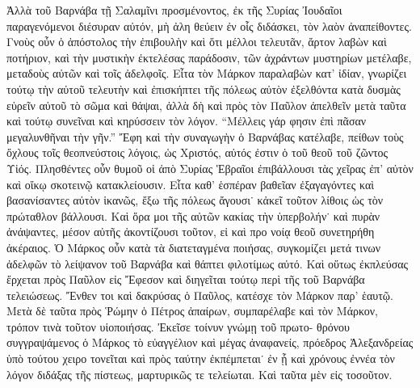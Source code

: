 Ἀλλὰ τοῦ Βαρνάβα τῇ Σαλαμῖνι προσμένοντος, ἐκ τῆς
Συρίας Ἰουδαῖοι παραγενόμενοι διέσυραν αὐτόν, μὴ ἀλη%
θεύειν ἐν οἷς διδάσκει, τὸν λαὸν ἀναπείθοντες. Γνοὺς
οὖν ὁ ἀπόστολος τὴν ἐπιβουλὴν καὶ ὅτι μέλλοι τελευτᾶν,
ἄρτον λαβὼν καὶ ποτήριον, καὶ τὴν μυστικὴν ἐκτελέσας
παράδοσιν, τῶν ἀχράντων μυστηρίων μετέλαβε, μεταδοὺς
αὐτῶν καὶ τοῖς ἀδελφοῖς. Εἶτα τὸν Μάρκον παραλαβὼν
κατ’ ἰδίαν, γνωρίζει τούτῳ τὴν αὐτοῦ τελευτὴν καὶ
ἐπισκήπτει τῆς πόλεως αὐτὸν ἐξελθόντα κατὰ δυσμὰς
εὑρεῖν αὐτοῦ τὸ σῶμα καὶ θάψαι, ἀλλὰ δὴ καὶ πρὸς
τὸν Παῦλον ἀπελθεῖν μετὰ ταῦτα καὶ τούτῳ συνεῖναι
καὶ κηρύσσειν τὸν λόγον. \enquote{Μέλλεις γάρ φησιν ἐπὶ πᾶσαν
μεγαλυνθῆναι τὴν γῆν.} Ἔφη καὶ τὴν συναγωγὴν ὁ
Βαρνάβας κατέλαβε, πείθων τοὺς ὄχλους τοῖς θεοπνεύστοις
λόγοις, ὡς Χριστός, αὐτός ἐστιν ὁ τοῦ θεοῦ τοῦ ζῶντος
Υἱός. Πλησθέντες οὖν θυμοῦ οἱ ἀπὸ Συρίας Ἑβραῖοι
ἐπιβάλλουσι τὰς χεῖρας ἐπ’ αὐτὸν καὶ οἴκῳ σκοτεινῷ
κατακλείουσιν. Εἶτα καθ’ ἑσπέραν βαθεῖαν ἐξαγαγόντες καὶ
βασανίσαντες αὐτὸν ἱκανῶς, ἔξω τῆς πόλεως ἄγουσι˙
κἀκεῖ τοῦτον λίθοις ὡς τὸν πρώταθλον βάλλουσι. Καὶ
ὅρα μοι τῆς αὐτῶν κακίας τὴν ὑπερβολήν˙ καὶ πυρὰν
ἀνάψαντες, μέσον αὐτῆς ἀκοντίζουσι τοῦτον, εἰ καὶ προ%
νοίᾳ θεοῦ συνετηρήθη ἀκέραιος. Ὁ Μάρκος οὖν κατὰ
τὰ διατεταγμένα ποιήσας, συγκομίζει μετά τινων ἀδελφῶν
τὸ λείψανον τοῦ Βαρνάβα καὶ θάπτει φιλοτίμως αὐτό.
Καὶ οὕτως ἐκπλεύσας ἔρχεται πρὸς Παῦλον εἰς Ἔφεσον
καὶ διηγεῖται τούτῳ περὶ τῆς τοῦ Βαρνάβα τελειώσεως.
Ἔνθεν τοι καὶ δακρύσας ὁ Παῦλος, κατέσχε τὸν Μάρκον
παρ’ ἑαυτῷ. Μετὰ δὲ ταῦτα πρὸς Ῥώμην ὁ Πέτρος
ἀπαίρων, συμπαρέλαβε καὶ τὸν Μάρκον, τρόπον τινὰ
τοῦτον υἱοποιήσας. Ἐκεῖσε τοίνυν γνώμῃ τοῦ πρωτο-
θρόνου συγγραψάμενος ὁ Μάρκος τὸ εὐαγγέλιον καὶ μέγας
ἀναφανείς, πρόεδρος Ἀλεξανδρείας ὑπὸ τούτου χειρο%
τονεῖται καὶ πρὸς ταύτην ἐκπέμπεται˙ ἐν ᾗ καὶ χρόνους
ἐννέα τὸν λόγον διδάξας τῆς πίστεως, μαρτυρικῶς τε%
τελείωται. Καὶ ταῦτα μὲν εἰς τοσοῦτον.


